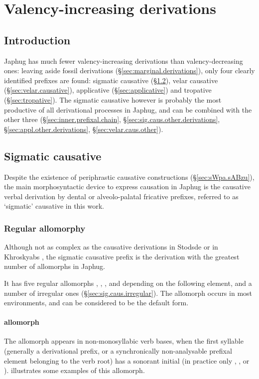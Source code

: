 \chapter{Valency-increasing derivations} \label{chap:valency.increasing.derivation}

\section{Introduction} 
Japhug has much fewer valency-increasing derivations than valency-decreasing ones: leaving aside fossil derivations (§\ref{sec:marginal.derivations}), only four clearly identified prefixes are found: sigmatic causative (§\ref{sec:sig.causative}), velar causative (§\ref{sec:velar.causative}), applicative (§\ref{sec:applicative}) and tropative (§\ref{sec:tropative}). The sigmatic causative however is probably the most productive of all derivational processes in Japhug,  and can be combined with the other three (§\ref{sec:inner.prefixal.chain}, §\ref{sec:sig.caus.other.derivations}, §\ref{sec:appl.other.derivations}, §\ref{sec:velar.caus.other}).
 

\section{Sigmatic causative} \label{sec:sig.causative}
Despite the existence of periphrastic causative constructions (§\ref{sec:sWpa.sABzu}), the main morphosyntactic device to express causation in Japhug is the causative verbal derivation by dental or alveolo-palatal fricative prefixes, referred to as `sigmatic' causative in this work.  

\subsection{Regular allomorphy} \label{sec:sig.caus.allomorphs}
Although not as complex as the causative derivations in Stodsde \citep{jackson07shangzhai} or in Khroskyabs \citep{lai16caus}, the sigmatic causative prefix is the derivation with the greatest number of allomorphs in Japhug.

It has five regular allomorphs , , ,  and  depending on the following element, and a number of irregular ones (§\ref{sec:sig.caus.irregular}). The allomorph  occurs in most environments, and can be considered to be the default form.

\subsubsection{ allomorph} \label{sec:caus.z}
The  allomorph appears in non-monosyllabic verb bases, when the first syllable (generally a derivational prefix, or a synchronically non-analysable prefixal element  belonging to the verb root) has a sonorant initial (in practice only , ,  or ).  illustrates some examples of this allomorph.

